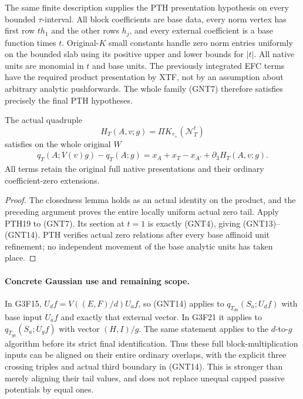 The same finite description supplies the PTH presentation
hypothesis on every bounded $\tau$-interval.  All block
coefficients are base data, every norm vertex has first row
$t h_1$ and the other rows $h_j$, and every external coefficient
is a base function times $t$.  Original-$K$ small constants handle
zero norm entries uniformly on the bounded slab using its positive
upper and lower bounds for $|t|$.  All native units are monomial
in $t$ and base units.  The previously integrated EFC terms have
the required product presentation by XTF, not by an assumption
about arbitrary analytic pushforwards.  The whole family (GNT7)
therefore satisfies precisely the final PTH hypotheses.

\begin{theorem}
The actual quadruple
\[
        H_T(A,v;g)=\Pi K_{\tau_+}(\mathcal N_T^t)
 \tag{GNT13}
\]
satisfies on the whole original $W$
\[
 \begin{split}
 q_T(A;V(v)g)-q_T(A;g)
       =x_A+x_T-x_{A'}+\partial_3 H_T(A,v;g).
 \end{split}
 \tag{GNT14}
\]
All terms retain the original full native presentations and their
ordinary coefficient-zero extensions.
\end{theorem}

\begin{proof}
The closedness lemma holds as an actual identity on the product,
and the preceding argument proves the entire locally uniform
actual zero tail.  Apply PTH19 to (GNT7).  Its section at $t=1$
is exactly (GNT4), giving (GNT13)--(GNT14).  PTH verifies actual
zero relations after every base affinoid unit refinement; no
independent movement of the base analytic units has taken place.
\end{proof}

\paragraph{Concrete Gaussian use and remaining scope.}
In G3F15, $U_df=V((E,F)/d)U_af$, so (GNT14) applies to
$q_{T_{da}}(S_a;U_df)$ with base input $U_af$ and exactly that
external vector.  In G3F21 it applies to
$q_{T_{ga}}(S_a;U_gf)$ with vector $(H,I)/g$.  The same statement
applies to the $d$-to-$g$ algorithm before its strict final
identification.  Thus these full block-multiplication inputs can
be aligned on their entire ordinary overlaps, with the explicit
three crossing triples and actual third boundary in (GNT14).
This is stronger than merely aligning their tail values, and
does not replace unequal capped passive potentials by equal ones.


